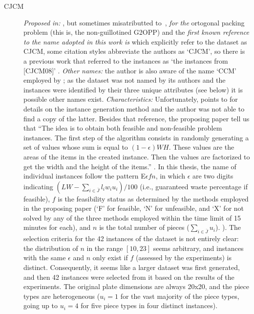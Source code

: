\documentclass[ppgc,tese,english,formais,babel]{iiufrgs}
\begin{document}
\begin{description}
\item [CJCM] \emph{Proposed in:} \citet{clautiaux:2007}, but sometimes misatributted to~\citet{clautiaux:2008}, \emph{for the} ortogonal packing problem (this is, the non-guillotined G2OPP) and the \emph{first known reference to the name adopted in this work is} \citet{cote:2018} which explicitly refer to the dataset as CJCM, some citation styles abbreviate the authors as `CJCM', so there is a previous work that referred to the instances as `the instances from [CJCM08]' \citep{belov2009branch}. \emph{Other names:} the author is also aware of the name `CCM' employed by \citep{fleszar:2016}; as the dataset was not named by its authors and the instances were identified by their three unique attributes (see below) it is possible other names exist. \emph{Characteristics:} Unfortunately, \citet{clautiaux:2007} points to \citet{hopper2002problem} for details on the instance generation method and the author was not able to find a copy of the latter. Besides that reference, the proposing paper tell us that ``The idea is to obtain both feasible and non-feasible problem instances. The first step of the algorithm consists in randomly generating a set of values whose sum is equal to \((1 - \epsilon)WH\). These values are the areas of the items in the created instance. Then the values are factorized to get the width and the height of the items.'' \citep{clautiaux:2007}. In this thesis, the name of individual instances follow the pattern E\(\epsilon f n\), in which \(\epsilon\) are two digits indicating \((LW - \sum_{i \in \bar{J}} l_i w_i u_i)/100\) (i.e., guaranteed waste percentage if feasible), \(f\) is the feasibility status as determined by the methods employed in the proposing paper (`F' for feasible, `N' for unfeasible, and `X' for not solved by any of the three methods employed within the time limit of 15 minutes for each), and \(n\) is the total number of pieces (\(\sum_{i \in \bar{J}} u_i\)). ). The selection criteria for the 42 instances of the dataset is not entirely clear: the distribution of \(n\) in the range \([10, 23]\) seems arbitrary, and instances with the same \(\epsilon\) and \(n\) only exist if \(f\) (assessed by the experiments) is distinct. Consequently, it seems like a larger dataset was first generated, and then 42 instances were selected from it based on the results of the experiments. The original plate dimensions are always 20x20, and the piece types are heterogeneous (\(u_i = 1\) for the vast majority of the piece types, going up to \(u_i = 4\) for five piece types in four distinct instances).

\end{description}
\end{document}

